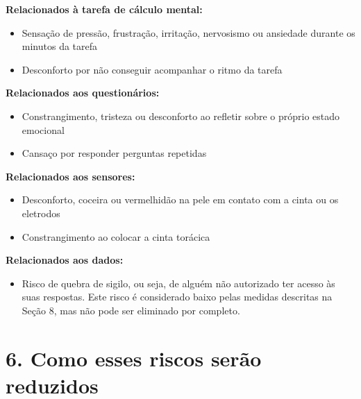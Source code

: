 \documentclass[12pt,a4paper]{article}
\begin{document}
\textbf{Relacionados à tarefa de cálculo mental:}
\begin{itemize}
  \item Sensação de pressão, frustração, irritação, nervosismo ou ansiedade durante os minutos da tarefa
  \item Desconforto por não conseguir acompanhar o ritmo da tarefa
\end{itemize}

\textbf{Relacionados aos questionários:}
\begin{itemize}
  \item Constrangimento, tristeza ou desconforto ao refletir sobre o próprio estado emocional
  \item Cansaço por responder perguntas repetidas
\end{itemize}

\textbf{Relacionados aos sensores:}
\begin{itemize}
  \item Desconforto, coceira ou vermelhidão na pele em contato com a cinta ou os eletrodos
  \item Constrangimento ao colocar a cinta torácica
\end{itemize}

\textbf{Relacionados aos dados:}
\begin{itemize}
  \item Risco de quebra de sigilo, ou seja, de alguém não autorizado ter acesso às suas respostas. Este risco é considerado baixo pelas medidas descritas na Seção 8, mas não pode ser eliminado por completo.
\end{itemize}

\section*{6. Como esses riscos serão reduzidos}
\end{document}
